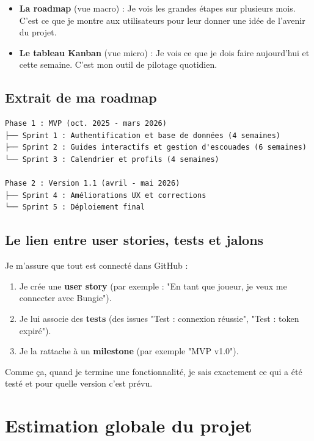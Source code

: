 \begin{itemize}
    \item \textbf{La roadmap} (vue macro) : Je vois les grandes étapes sur plusieurs mois. C'est ce que je montre aux utilisateurs pour leur donner une idée de l'avenir du projet.
    \item \textbf{Le tableau Kanban} (vue micro) : Je vois ce que je dois faire aujourd'hui et cette semaine. C'est mon outil de pilotage quotidien.
\end{itemize}

\subsection{Extrait de ma roadmap}

\begin{verbatim}
Phase 1 : MVP (oct. 2025 - mars 2026)
├── Sprint 1 : Authentification et base de données (4 semaines)
├── Sprint 2 : Guides interactifs et gestion d'escouades (6 semaines)
└── Sprint 3 : Calendrier et profils (4 semaines)

Phase 2 : Version 1.1 (avril - mai 2026)
├── Sprint 4 : Améliorations UX et corrections
└── Sprint 5 : Déploiement final
\end{verbatim}

\subsection{Le lien entre user stories, tests et jalons}

Je m'assure que tout est connecté dans GitHub :

\begin{enumerate}
    \item Je crée une \textbf{user story} (par exemple : "En tant que joueur, je veux me connecter avec Bungie").
    \item Je lui associe des \textbf{tests} (des issues "Test : connexion réussie", "Test : token expiré").
    \item Je la rattache à un \textbf{milestone} (par exemple "MVP v1.0").
\end{enumerate}

Comme ça, quand je termine une fonctionnalité, je sais exactement ce qui a été testé et pour quelle version c'est prévu.

\section{Estimation globale du projet}

